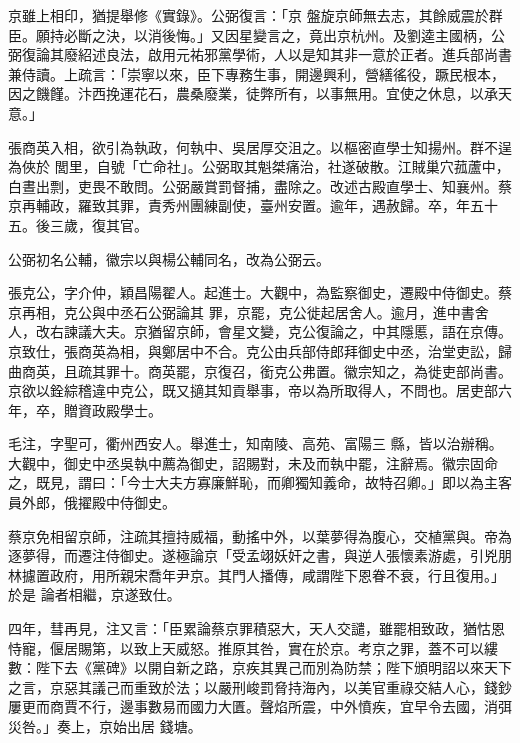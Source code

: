 \begin{pinyinscope}
 京雖上相印，猶提舉修《實錄》。公弼復言：「京
 盤旋京師無去志，其餘威震於群臣。願持必斷之決，以消後悔。」又因星變言之，竟出京杭州。及劉逵主國柄，公弼復論其廢紹述良法，啟用元祐邪黨學術，人以是知其非一意於正者。進兵部尚書兼侍讀。上疏言：「崇寧以來，臣下專務生事，開邊興利，營繕徭役，蹶民根本，因之饑饉。汴西挽運花石，農桑廢業，徒弊所有，以事無用。宜使之休息，以承天意。」



 張商英入相，欲引為執政，何執中、吳居厚交沮之。以樞密直學士知揚州。群不逞為俠於
 閭里，自號「亡命社」。公弼取其魁桀痛治，社遂破散。江賊巢穴菰蘆中，白晝出剽，吏畏不敢問。公弼嚴賞罰督捕，盡除之。改述古殿直學士、知襄州。蔡京再輔政，羅致其罪，責秀州團練副使，臺州安置。逾年，遇赦歸。卒，年五十五。後三歲，復其官。



 公弼初名公輔，徽宗以與楊公輔同名，改為公弼云。



 張克公，字介仲，穎昌陽翟人。起進士。大觀中，為監察御史，遷殿中侍御史。蔡京再相，克公與中丞石公弼論其
 罪，京罷，克公徙起居舍人。逾月，進中書舍人，改右諫議大夫。京猶留京師，會星文變，克公復論之，中其隱慝，語在京傳。京致仕，張商英為相，與鄭居中不合。克公由兵部侍郎拜御史中丞，治堂吏訟，歸曲商英，且疏其罪十。商英罷，京復召，銜克公弗置。徽宗知之，為徙吏部尚書。京欲以銓綜稽違中克公，既又擿其知貢舉事，帝以為所取得人，不問也。居吏部六年，卒，贈資政殿學士。



 毛注，字聖可，衢州西安人。舉進士，知南陵、高苑、富陽三
 縣，皆以治辦稱。大觀中，御史中丞吳執中薦為御史，詔賜對，未及而執中罷，注辭焉。徽宗固命之，既見，謂曰：「今士大夫方寡廉鮮恥，而卿獨知義命，故特召卿。」即以為主客員外郎，俄擢殿中侍御史。



 蔡京免相留京師，注疏其擅持威福，動搖中外，以葉夢得為腹心，交植黨與。帝為逐夢得，而遷注侍御史。遂極論京「受孟翊妖奸之書，與逆人張懷素游處，引兇朋林攄置政府，用所親宋喬年尹京。其門人播傳，咸謂陛下恩眷不衰，行且復用。」於是
 論者相繼，京遂致仕。



 四年，彗再見，注又言：「臣累論蔡京罪積惡大，天人交譴，雖罷相致政，猶怙恩恃寵，偃居賜第，以致上天威怒。推原其咎，實在於京。考京之罪，蓋不可以縷數：陛下去《黨碑》以開自新之路，京疾其異己而別為防禁；陛下頒明詔以來天下之言，京惡其議己而重致於法；以嚴刑峻罰脅持海內，以美官重祿交結人心，錢鈔屢更而商賈不行，邊事數易而國力大匱。聲焰所震，中外憤疾，宜早令去國，消弭災咎。」奏上，京始出居
 錢塘。




\end{pinyinscope}
